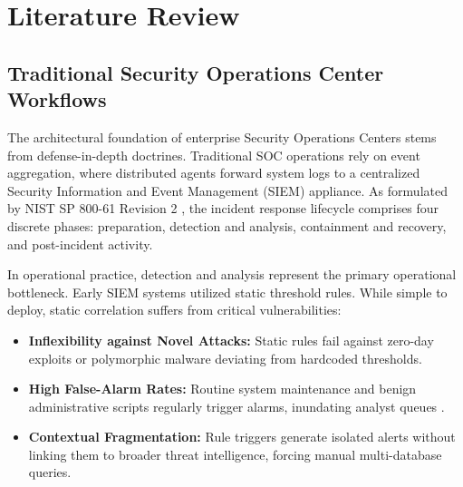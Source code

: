 \chapter{Literature Review}
\label{ch:literature}

\section{Traditional Security Operations Center Workflows}
\label{sec:lit_traditional_soc}
The architectural foundation of enterprise Security Operations Centers stems from defense-in-depth doctrines. Traditional SOC operations rely on event aggregation, where distributed agents forward system logs to a centralized Security Information and Event Management (SIEM) appliance. As formulated by NIST SP 800-61 Revision 2 \cite{nist_sp800_61}, the incident response lifecycle comprises four discrete phases: preparation, detection and analysis, containment and recovery, and post-incident activity.

In operational practice, detection and analysis represent the primary operational bottleneck. Early SIEM systems utilized static threshold rules. While simple to deploy, static correlation suffers from critical vulnerabilities:
\begin{itemize}
  \item \textbf{Inflexibility against Novel Attacks:} Static rules fail against zero-day exploits or polymorphic malware deviating from hardcoded thresholds.
  \item \textbf{High False-Alarm Rates:} Routine system maintenance and benign administrative scripts regularly trigger alarms, inundating analyst queues \cite{sarker2023soc}.
  \item \textbf{Contextual Fragmentation:} Rule triggers generate isolated alerts without linking them to broader threat intelligence, forcing manual multi-database queries.
\end{itemize}


